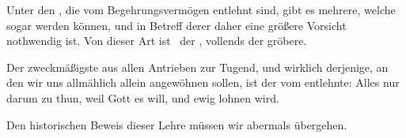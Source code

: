 \begin{aufza}
\item Unter den , die vom Begehrungsvermögen entlehnt sind, gibt es mehrere, welche sogar  werden können, und in Betreff derer daher eine größere Vorsicht nothwendig ist. Von dieser Art ist \zB\  der , vollends der gröbere.
\item Der zweckmäßigste aus allen Antrieben zur Tugend, und wirklich derjenige, an den wir uns allmählich allein angewöhnen sollen, ist der vom  entlehnte: Alles nur darum zu thun, weil Gott es will, und ewig lohnen wird.
\end{aufza}
\begin{RWanm} 
Den historischen Beweis dieser Lehre müssen wir abermals übergehen. 
\end{RWanm}

